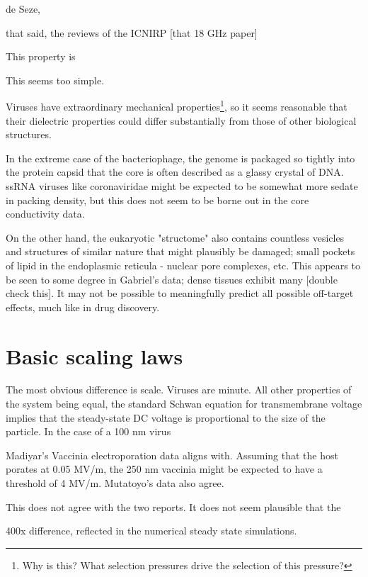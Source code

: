 \documentclass[fleqn,10pt]{paper}
\begin{document}
de Seze, 

that said, the reviews of the ICNIRP [that 18 GHz  paper]

This property is 
\cite{Nanosecond2006b} 



This seems too simple.

Viruses have extraordinary mechanical properties\footnote{Why is this? What selection pressures drive the selection of this pressure?}, so it seems reasonable that their dielectric properties could differ substantially from those of other biological structures. 

In the extreme case of the bacteriophage, the genome is packaged so tightly into the protein capsid that the core is often described as a glassy crystal of DNA\cite{Conformation2007}. ssRNA viruses like coronaviridae might be expected to be somewhat more sedate in packing density, but this does not seem to be borne out in the core conductivity data.

On the other hand, the eukaryotic "structome" also contains countless vesicles and structures of similar nature that might plausibly be damaged; small pockets of lipid in the endoplasmic reticula - nuclear pore complexes, etc. This appears to be seen to some degree in Gabriel's data; dense tissues exhibit many [double check this]. It may not be possible to meaningfully predict all possible off-target effects, much like in drug discovery.

\section*{Basic scaling laws}

The most obvious difference is scale. Viruses are minute. All other properties of the system being equal, the standard Schwan equation for transmembrane voltage implies that the steady-state DC voltage is proportional to the size of the particle. In the case of a 100 nm virus 



Madiyar's Vaccinia electroporation data aligns with. Assuming that the host porates at 0.05 MV/m, the 250 nm vaccinia might be expected to have a threshold of 4 MV/m. Mutatoyo's data also agree.  

This does not agree with the two reports. It does not seem plausible that the 


400x difference, reflected in the numerical steady state simulations.
\end{document}
